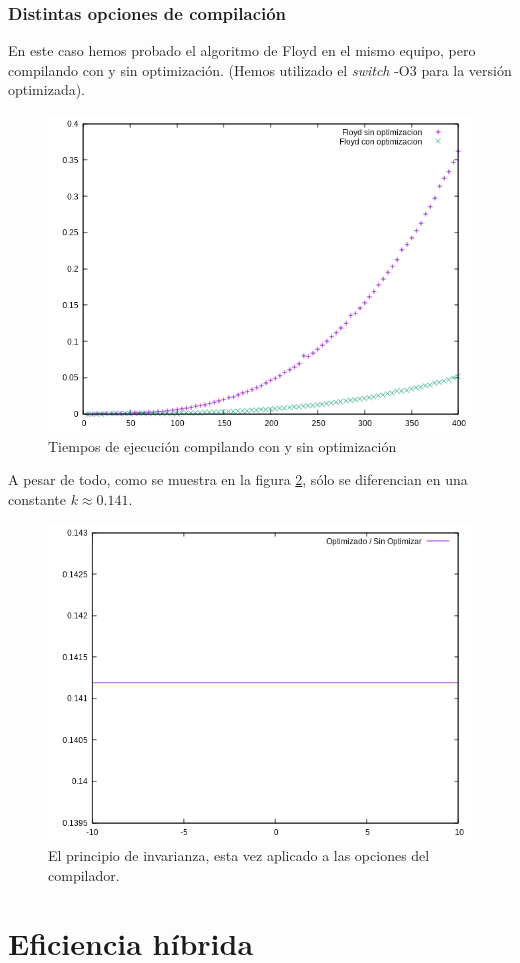 \documentclass{article}
\begin{document}
\subsubsection{Distintas opciones de compilación}
En este caso hemos probado el algoritmo de Floyd en el mismo equipo, pero compilando con y sin optimización. (Hemos utilizado el \textit{switch} -O3 para la versión optimizada).

\begin{figure}[H]
	\centering
	\includegraphics[totalheight=8cm]{img/optimizacion_floyd}
	\caption{Tiempos de ejecución compilando con y sin optimización}
	\label{fig:optimizacion_floyd}
\end{figure}

A pesar de todo, como se muestra en la figura \ref{fig:optimizacion_cociente}, sólo se diferencian en una constante $k \approx 0.141 $.
\begin{figure}[H]
	\centering
	\includegraphics[totalheight=8cm]{img/optimizacion_cociente}
	\caption{El principio de invarianza, esta vez aplicado a las opciones del compilador.}
	\label{fig:optimizacion_cociente}
\end{figure}

\section{Eficiencia híbrida}
\end{document}
